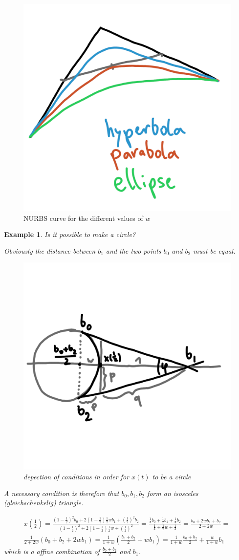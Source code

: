 \documentclass[]{article}
\newtheorem{example}{Example}
\begin{document}
\begin{figure}[h!]
	\centering
	\includegraphics[width=0.3\linewidth]{figures/nurbs_par_hyp_ellip}
	\caption{NURBS curve for the different values of $w$}
	\label{fig:nurbs_par_hyp_ellip}
\end{figure}

\begin{example}
	Is it possible to make a circle?
	
	Obviously the distance between $b_1$ and the two points $b_0$ and $b_2$ must be equal.
	
	\begin{figure}[h!]
		\centering
		\includegraphics[width=0.3\linewidth]{figures/nurbs_circle}
		\caption{depection of conditions in order for $x(t)$ to be a circle}
		\label{fig:nurbs_circle}
	\end{figure}
	
	A necessary condition is therefore that $b_0, b_1, b_2$ form an isosceles (gleichschenkelig) triangle.
	
	
	\begin{align*}
		x(\frac{1}{2}) = \frac{(1-\frac{1}{2})^2b_0 + 2(1-\frac{1}{2})\frac{1}{2}wb_1 + (\frac{1}{2})^2b_2}{(1-\frac{1}{2})^2 + 2(1-\frac{1}{2})\frac{1}{2}w + (\frac{1}{2})^2} = \frac{\frac{1}{4}b_0 + \frac{1}{2}b_1 + \frac{1}{4}b_2}{\frac{1}{4} + \frac{1}{2}w + \frac{1}{4}} = \frac{b_0 + 2wb_1 + b_2}{2+2w} =\\
		\frac{1}{2+2w}(b_0 + b_2 + 2wb_1) = \frac{1}{1+w}(\frac{b_0+b_2}{2} +wb_1) = \frac{1}{1+w} \frac{b_0 + b_2}{2} + \frac{w}{1+w} b_1
	\end{align*}
	which is a affine combination of $\frac{b_0 + b_2}{2}$ and $b_1$.
	

\end{example}
\end{document}
